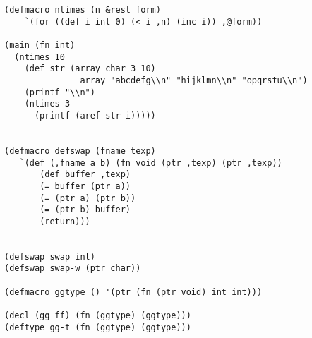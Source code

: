  \begin{verbatim}
(defmacro ntimes (n &rest form)
    `(for ((def i int 0) (< i ,n) (inc i)) ,@form)) 

(main (fn int)
  (ntimes 10 
    (def str (array char 3 10) 
               array "abcdefg\\n" "hijklmn\\n" "opqrstu\\n")
    (printf "\\n")
    (ntimes 3
      (printf (aref str i)))))


(defmacro defswap (fname texp)
   `(def (,fname a b) (fn void (ptr ,texp) (ptr ,texp))
       (def buffer ,texp)
       (= buffer (ptr a))
       (= (ptr a) (ptr b))
       (= (ptr b) buffer)
       (return)))


(defswap swap int)
(defswap swap-w (ptr char))

(defmacro ggtype () '(ptr (fn (ptr void) int int)))

(decl (gg ff) (fn (ggtype) (ggtype)))
(deftype gg-t (fn (ggtype) (ggtype)))
\end{verbatim} 

